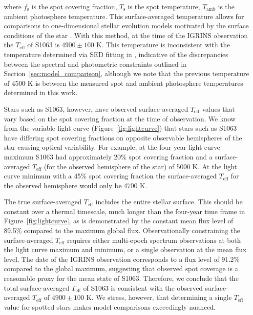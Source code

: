 \documentclass[trackchanges]{aastex631}
\begin{document}
where $f_{\textrm{s}}$ is the spot covering fraction, $T_{\textrm{s}}$ is the spot temperature, $T_{\textrm{amb}}$ is the ambient photosphere temperature. This surface-averaged temperature allows for comparisons to one-dimensional stellar evolution models motivated by the surface conditions of the star \citep{somers20}. With this method, at the time of the IGRINS observation the $T_{\textrm{eff}}$ of S1063 is $4900\pm100$ K. This temperature is inconsistent with the temperature determined via SED fitting in \citet{leiner17}, indicative of the discrepancies between the spectral and photometric constraints outlined in Section~\ref{sec:model_comparison}, although we note that the previous temperature of 4500 K is between the measured spot and ambient photosphere temperatures determined in this work.

Stars such as S1063, however, have observed surface-averaged $T_{\textrm{eff}}$ values that vary based on the spot covering fraction at the time of observation. We know from the variable light curve (Figure~\ref{fig:lightcurve}) that stars such as S1063 have differing spot covering fractions on opposite observable hemispheres of the star causing optical variability. For example, at the four-year light curve maximum S1063 had approximately 20\% spot covering fraction and a surface-averaged $T_{\textrm{eff}}$ (for the observed hemisphere of the star) of 5000 K. At the light curve minimum with a 45\% spot covering fraction the surface-averaged $T_{\textrm{eff}}$ for the observed hemisphere would only be 4700 K.

The true surface-averaged $T_{\textrm{eff}}$ includes the entire stellar surface. This should be constant over a thermal timescale, much longer than the four-year time frame in Figure~\ref{fig:lightcurve}, as is demonstrated by the constant mean flux level of 89.5\% compared to the maximum global flux. Observationally constraining the surface-averaged $T_{\textrm{eff}}$ requires either multi-epoch spectrum observations at both the light curve maximum and minimum, or a single observation at the mean flux level. The date of the IGRINS observation corresponds to a flux level of 91.2\% compared to the global maximum, suggesting that observed spot coverage is a reasonable proxy for the mean state of S1063. Therefore, we conclude that the total surface-averaged $T_{\textrm{eff}}$ of S1063 is consistent with the observed surface-averaged $T_{\textrm{eff}}$ of $4900\pm100$ K. We stress, however, that determining a single $T_{\textrm{eff}}$ value for spotted stars makes model comparisons exceedingly nuanced.
\end{document}
